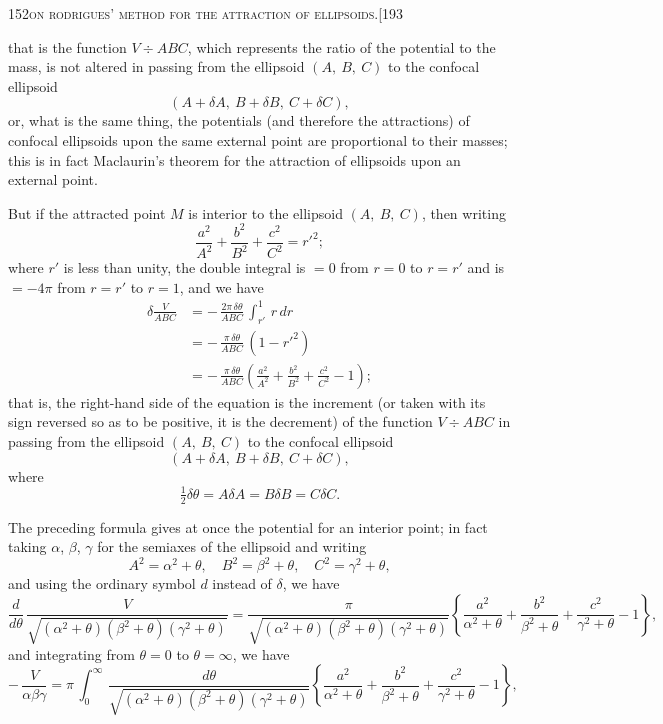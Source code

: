 \documentclass[11pt]{article}
\begin{document}
\begin{center}
\small 152\hfill\textsc{on rodrigues' method for the attraction of ellipsoids.}\hfill[193
\end{center}

\medskip

\noindent that is the function $V \div A B C$, which represents the ratio of the potential to the mass, is not altered in passing from the ellipsoid $(A,\ B,\ C)$ to the confocal ellipsoid
\[
(A + \delta A,\ B + \delta B,\ C + \delta C),
\]
or, what is the same thing, the potentials (and therefore the attractions) of confocal ellipsoids upon the same external point are proportional to their masses; this is in fact Maclaurin's theorem for the attraction of ellipsoids upon an external point.

But if the attracted point $M$ is interior to the ellipsoid $(A,\ B,\ C)$, then writing
\[
\frac{a^{2}}{A^{2}} + \frac{b^{2}}{B^{2}} + \frac{c^{2}}{C^{2}} = r'^{2};
\]
where $r'$ is less than unity, the double integral is $= 0$ from $r = 0$ to $r = r'$ and is $= -4\pi$ from $r = r'$ to $r = 1$, and we have
\begin{align*}
\delta\frac{V}{A B C} &= -\,\frac{2\pi\,\delta\theta}{A B C}\,\int_{r'}^{1}\,r\,dr \\
&= -\,\frac{\pi\,\delta\theta}{A B C}\,(1 - r'^{2}) \\
&= -\,\frac{\pi\,\delta\theta}{A B C}\left(\frac{a^{2}}{A^{2}} + \frac{b^{2}}{B^{2}} + \frac{c^{2}}{C^{2}} - 1\right);
\end{align*}
that is, the right-hand side of the equation is the increment (or taken with its sign reversed so as to be positive, it is the decrement) of the function $V \div A B C$ in passing from the ellipsoid $(A,\ B,\ C)$ to the confocal ellipsoid
\[
(A + \delta A,\ B + \delta B,\ C + \delta C),
\]
where
\[
\tfrac{1}{2}\delta\theta = A\delta A = B\delta B = C\delta C.
\]

The preceding formula gives at once the potential for an interior point; in fact taking $\alpha$, $\beta$, $\gamma$ for the semiaxes of the ellipsoid and writing
\[
A^{2} = \alpha^{2} + \theta,\quad B^{2} = \beta^{2} + \theta,\quad C^{2} = \gamma^{2} + \theta,
\]
and using the ordinary symbol $d$ instead of $\delta$, we have
\[
\frac{d}{d\theta}\,\frac{V}{\sqrt{(\alpha^{2} + \theta)(\beta^{2} + \theta)(\gamma^{2} + \theta)}} = \frac{\pi}{\sqrt{(\alpha^{2} + \theta)(\beta^{2} + \theta)(\gamma^{2} + \theta)}}\left\{\frac{a^{2}}{\alpha^{2} + \theta} + \frac{b^{2}}{\beta^{2} + \theta} + \frac{c^{2}}{\gamma^{2} + \theta} - 1\right\},
\]
and integrating from $\theta = 0$ to $\theta = \infty$, we have
\[
-\,\frac{V}{\alpha\beta\gamma} = \pi\,\int_{0}^{\infty}\,\frac{d\theta}{\sqrt{(\alpha^{2} + \theta)(\beta^{2} + \theta)(\gamma^{2} + \theta)}}\left\{\frac{a^{2}}{\alpha^{2} + \theta} + \frac{b^{2}}{\beta^{2} + \theta} + \frac{c^{2}}{\gamma^{2} + \theta} - 1\right\},
\]
\end{document}
